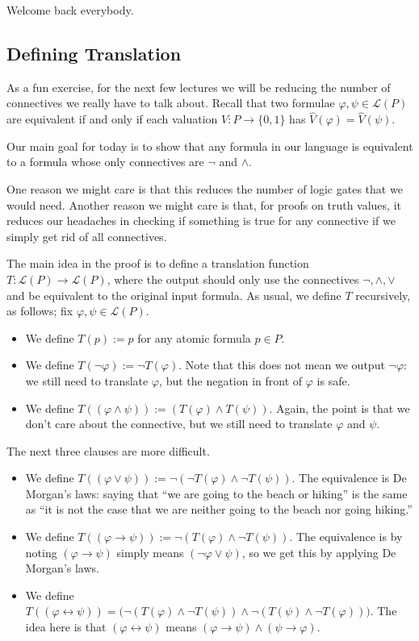 
Welcome back everybody.

\subsection{Defining Translation}
As a fun exercise, for the next few lectures we will be reducing the number of connectives we really have to talk about. Recall that two formulae $\varphi,\psi\in\mathcal L(P)$ are equivalent if and only if each valuation $V:P\to\{0,1\}$ has $\hat V(\varphi)=\hat V(\psi)$.

Our main goal for today is to show that any formula in our language is equivalent to a formula whose only connectives are $\lnot$ and $\land$.
\begin{remark}
	One reason we might care is that this reduces the number of logic gates that we would need. Another reason we might care is that, for proofs on truth values, it reduces our headaches in checking if something is true for any connective if we simply get rid of all connectives.
\end{remark}
The main idea in the proof is to define a translation function $T:\mathcal L(P)\to\mathcal L(P)$, where the output should only use the connectives $\lnot,\land,\lor$ and be equivalent to the original input formula. As usual, we define $T$ recursively, as follows; fix $\varphi,\psi\in\mathcal L(P)$.
\begin{itemize}
	\item We define $T(p):=p$ for any atomic formula $p\in P$.
	\item We define $T(\lnot\varphi):=\lnot T(\varphi)$. Note that this does not mean we output $\lnot\varphi$: we still need to translate $\varphi$, but the negation in front of $\varphi$ is safe.
	\item We define $T((\varphi\land\psi)):=(T(\varphi)\land T(\psi))$. Again, the point is that we don't care about the connective, but we still need to translate $\varphi$ and $\psi$.
\end{itemize}
The next three clauses are more difficult.
\begin{itemize}
	\item We define $T((\varphi\lor\psi)):=\lnot(\lnot T(\varphi)\land\lnot T(\psi))$. The equivalence is De Morgan's laws: saying that ``we are going to the beach or hiking'' is the same as ``it is not the case that we are neither going to the beach nor going hiking.''
	\item We define $T((\varphi\to\psi)):=\lnot(T(\varphi)\land\lnot T(\psi))$. The equivalence is by noting $(\varphi\to\psi)$ simply means $(\lnot\varphi\lor\psi)$, so we get this by applying De Morgan's laws.
	\item We define $T((\varphi\leftrightarrow\psi))=\big(\lnot(T(\varphi)\land\lnot T(\psi))\land\lnot(T(\psi)\land\lnot T(\varphi))\big)$. The idea here is that $(\varphi\leftrightarrow\psi)$ means $(\varphi\to\psi)\land(\psi\to\varphi)$.
\end{itemize}
